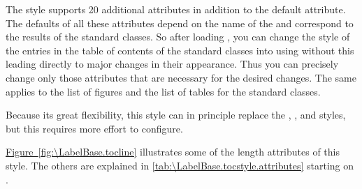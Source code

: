 \begin{description}
  The style supports 20 additional attributes in
  addition to the default  attribute. The defaults of all these
  attributes depend on the name of the  and correspond to
  the results of the standard classes. So after loading ,
  you can change the style of the entries in the table of contents of the
  standard classes into  using
   without this leading directly
  to major changes in their appearance. Thus you can precisely change only
  those attributes that are necessary for the desired changes. The same
  applies to the list of figures and the list of tables for the standard
  classes.

  Because its great flexibility, this style can in principle replace the
  , , and 
  styles, but this requires more effort to configure.

  \hyperref[fig:\LabelBase.tocline]%
  {Figure~\ref*{fig:\LabelBase.tocline}} illustrates some of the length
  attributes of this style. The others are explained in
  \autoref{tab:\LabelBase.tocstyle.attributes} starting on
  .
  \begin{figure}
    \centering
\end{figure}
\end{description}
